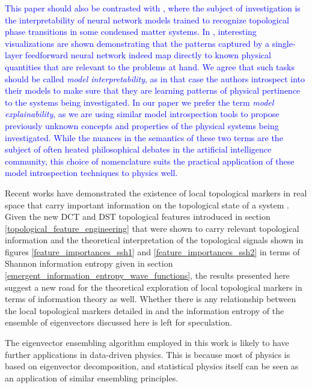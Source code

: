 \documentclass[10pt]{revtex4-1}
\newcommand{\citequote}[1]{\ref{#1}}
\begin{document}
\textcolor{blue}{This paper should also be contrasted with \cite{zhang2020interpreting}, where the subject of investigation is the interpretability of neural network models trained to recognize topological phase transitions in some condensed matter systems. In \cite{zhang2020interpreting}, interesting visualizations are shown demonstrating that the patterns captured by a single-layer feedforward neural network indeed map directly to known physical quantities that are relevant to the problems at hand. We agree that such tasks should be called \emph{model interpretability}, as in that case the authors introspect into their models to make sure that they are learning patterns of physical pertinence to the systems being investigated. In our paper we prefer the term \emph{model explainability}, as we are using similar model introspection tools to propose previously unknown concepts and properties of the physical systems being investigated. While the nuances in the semantics of these two terms are the subject of often heated philosophical debates in the artificial intelligence community, this choice of nomenclature suits the practical application of these model introspection techniques to physics well.}%

Recent works have demonstrated the existence of local topological markers in real space that carry important information on the topological state of a system \cite{PhysRevB.84.241106,caio2019topological}. Given the new DCT and DST topological features introduced in section \ref{topological_feature_engineering} that were shown to carry relevant topological information and the theoretical interpretation of the topological signals shown in figures \ref{feature_importances_ssh1} and \ref{feature_importances_ssh2} in terms of Shannon information entropy given in section \ref{emergent_information_entropy_wave_functions}, the results presented here suggest a new road for the theoretical exploration of local topological markers in terms of information theory as well. Whether there is any relationship between the local topological markers detailed in \cite{PhysRevB.84.241106,caio2019topological} and the information entropy of the ensemble of eigenvectors discussed here is left for speculation.
 
The eigenvector ensembling algorithm employed in this work is likely to have further applications in data-driven physics. This is because most of physics is based on eigenvector decomposition, and statistical physics itself can be seen as an application of similar ensembling principles. 
\end{document}
